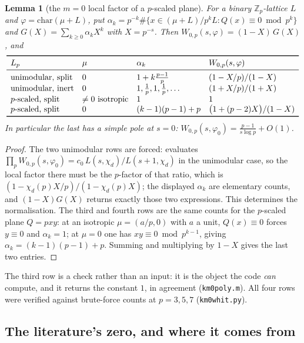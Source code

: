 \documentclass[11pt,reqno]{amsart}
\theoremstyle{plain}
\newtheorem{lemma}[theorem]{Lemma}
\theoremstyle{definition}
\newcommand{\Z}{\mathbb{Z}}
\begin{document}
\begin{lemma}[the $m=0$ local factor of a $p$-scaled plane]\label{lem:m0loc}
For a binary $\Z_p$-lattice $L$ and $\varphi=\mathrm{char}(\mu+L)$, put
$\alpha_k=p^{-k}\#\{x\in(\mu+L)/p^kL: Q(x)\equiv0 \bmod p^k\}$ and
$G(X)=\sum_{k\ge0}\alpha_kX^k$ with $X=p^{-s}$. Then $W_{0,p}(s,\varphi)=(1-X)\,G(X)$, and
\[
\begin{array}{llll}
\toprule
\text{$L_p$} & \text{$\mu$} & \alpha_k & W_{0,p}(s,\varphi)\\
\midrule
\text{unimodular, split} & 0 & 1+k\tfrac{p-1}{p} & (1-X/p)/(1-X)\\
\text{unimodular, inert} & 0 & 1,\tfrac1p,1,\tfrac1p,\dots & (1+X/p)/(1+X)\\
\text{$p$-scaled, split} & \neq0 \text{ isotropic} & 1 & 1\\
\text{$p$-scaled, split} & 0 & (k-1)(p-1)+p & \bigl(1+(p-2)X\bigr)/(1-X)\\
\bottomrule
\end{array}
\]
In particular the last has a \emph{simple pole} at $s=0$:
$W_{0,p}(s,\varphi_0)=\tfrac{p-1}{s\log p}+O(1)$.
\end{lemma}

\begin{proof}
The two unimodular rows are forced: \cite[Lem.~2.18]{SchoferThesis} evaluates
$\prod_pW_{0,p}(s,\varphi_0)=c_0\,L(s,\chi_d)/L(s+1,\chi_d)$ in the unimodular case, so the local
factor there must be the $p$-factor of that ratio, which is $(1-\chi_d(p)X/p)/(1-\chi_d(p)X)$; the
displayed $\alpha_k$ are elementary counts, and $(1-X)G(X)$ returns exactly those two expressions.
This determines the normalisation. The third and fourth rows are the same counts for the $p$-scaled
plane $Q=pxy$: at an isotropic $\mu=(a/p,0)$ with $a$ a unit, $Q(x)\equiv0$ forces $y\equiv0$ and
$\alpha_k=1$; at $\mu=0$ one has $xy\equiv0\bmod p^{k-1}$, giving $\alpha_k=(k-1)(p-1)+p$. Summing
and multiplying by $1-X$ gives the last two entries.
\end{proof}

The third row is a check rather than an input: it is the object the code \emph{can} compute, and it
returns the constant $1$, in agreement (\texttt{km0poly.m}). All four rows were verified against
brute-force counts at $p=3,5,7$ (\texttt{km0whit.py}).

\subsection*{The literature's zero, and where it comes from}
\end{document}
